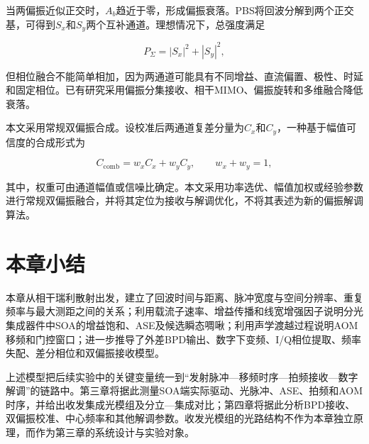当两偏振近似正交时，$A_b$趋近于零，形成偏振衰落。PBS将回波分解到两个正交基，可得到$S_x$和$S_y$两个互补通道。理想情况下，总强度满足

\begin{equation}
P_{\Sigma}=|S_x|^2+|S_y|^2,
\label{eq:polarization_power}
\end{equation}

但相位融合不能简单相加，因为两通道可能具有不同增益、直流偏置、极性、时延和固定相位。已有研究采用偏振分集接收、相干MIMO、偏振旋转和多维融合降低衰落\cite{dorize2018polarization,mompo2019distributed,tu2020fading,guerrier2020mimo,gorajoobi2022polarization,xie2023fading}。

本文采用常规双偏振合成。设校准后两通道复差分量为$C_x$和$C_y$，一种基于幅值可信度的合成形式为

\begin{equation}
C_{\mathrm{comb}}
=
w_x C_x+w_y C_y,
\qquad
w_x+w_y=1,
\label{eq:polarization_fusion}
\end{equation}

其中，权重可由通道幅值或信噪比确定。本文采用功率选优、幅值加权或经验参数进行常规双偏振融合，并将其定位为接收与解调优化，不将其表述为新的偏振解调算法。

\section{本章小结}

本章从相干瑞利散射出发，建立了回波时间与距离、脉冲宽度与空间分辨率、重复频率与最大测距之间的关系；利用载流子速率、增益传播和线宽增强因子说明分光集成器件中SOA的增益饱和、ASE及候选瞬态啁啾；利用声学渡越过程说明AOM移频和门控窗口；进一步推导了外差BPD输出、数字下变频、I/Q相位提取、频率失配、差分相位和双偏振接收模型。

上述模型把后续实验中的关键变量统一到“发射脉冲—移频时序—拍频接收—数字解调”的链路中。第三章将据此测量SOA端实际驱动、光脉冲、ASE、拍频和AOM时序，并给出收发集成光模组及分立—集成对比；第四章将据此分析BPD接收、双偏振校准、中心频率和其他解调参数。收发光模组的光路结构不作为本章独立原理，而作为第三章的系统设计与实验对象。
